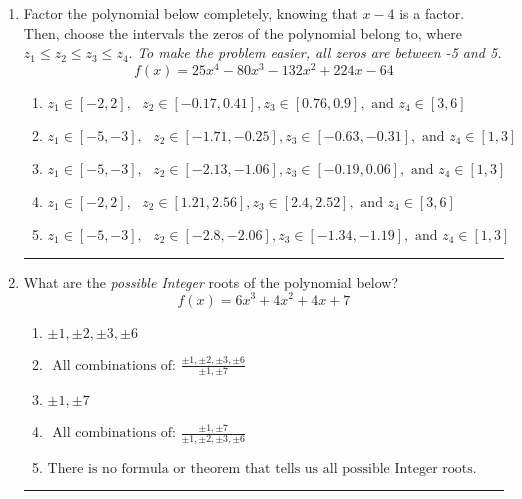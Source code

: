 \documentclass[14pt]{extbook}
\newcommand{\litem}[1]{\item#1\hspace*{-1cm}\rule{\textwidth}{0.4pt}}
\begin{document}
\begin{enumerate}
{\begin{enumerate}[label=\Alph*.]
\end{enumerate} }
\litem{
Factor the polynomial below completely, knowing that $x -4$ is a factor. Then, choose the intervals the zeros of the polynomial belong to, where $z_1 \leq z_2 \leq z_3 \leq z_4$. \textit{To make the problem easier, all zeros are between -5 and 5.}\[ f(x) = 25x^{4} -80 x^{3} -132 x^{2} +224 x -64 \]\begin{enumerate}[label=\Alph*.]
\item \( z_1 \in [-2, 2], \text{   }  z_2 \in [-0.17, 0.41], z_3 \in [0.76, 0.9], \text{   and   } z_4 \in [3, 6] \)
\item \( z_1 \in [-5, -3], \text{   }  z_2 \in [-1.71, -0.25], z_3 \in [-0.63, -0.31], \text{   and   } z_4 \in [1, 3] \)
\item \( z_1 \in [-5, -3], \text{   }  z_2 \in [-2.13, -1.06], z_3 \in [-0.19, 0.06], \text{   and   } z_4 \in [1, 3] \)
\item \( z_1 \in [-2, 2], \text{   }  z_2 \in [1.21, 2.56], z_3 \in [2.4, 2.52], \text{   and   } z_4 \in [3, 6] \)
\item \( z_1 \in [-5, -3], \text{   }  z_2 \in [-2.8, -2.06], z_3 \in [-1.34, -1.19], \text{   and   } z_4 \in [1, 3] \)

\end{enumerate} }
\litem{
What are the \textit{possible Integer} roots of the polynomial below?\[ f(x) = 6x^{3} +4 x^{2} +4 x + 7 \]\begin{enumerate}[label=\Alph*.]
\item \( \pm 1,\pm 2,\pm 3,\pm 6 \)
\item \( \text{ All combinations of: }\frac{\pm 1,\pm 2,\pm 3,\pm 6}{\pm 1,\pm 7} \)
\item \( \pm 1,\pm 7 \)
\item \( \text{ All combinations of: }\frac{\pm 1,\pm 7}{\pm 1,\pm 2,\pm 3,\pm 6} \)
\item \( \text{There is no formula or theorem that tells us all possible Integer roots.} \)

\end{enumerate} }
\end{enumerate}
\end{document}
